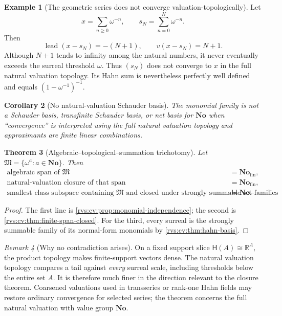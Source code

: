 \documentclass[11pt,letterpaper]{article}
\numberwithin{equation}{section}
\newtheorem{theorem}{Theorem}[section]
\newtheorem{corollary}[theorem]{Corollary}
\theoremstyle{definition}
\newtheorem{example}[theorem]{Example}
\theoremstyle{remark}
\newtheorem{remark}[theorem]{Remark}
\newcommand{\No}{\mathbf{No}}
\newcommand{\R}{\mathbb{R}}
\newcommand{\M}{\mathfrak{M}}
\newcommand{\Hahn}{\mathsf{H}}
\newcommand{\Fin}{\No_{\mathrm{fin}}}
\newcommand{\lead}{\operatorname{lead}}
\begin{document}
\begin{example}[The geometric series does not converge valuation-topologically]
Let
\[
  x=\sum_{n\ge0}\omega^{-n},
  \qquad
  s_N=\sum_{n=0}^{N}\omega^{-n}.
\]
Then
\[
  \lead(x-s_N)=-(N+1),\qquad v(x-s_N)=N+1.
\]
Although $N+1$ tends to infinity among the natural numbers, it never eventually
exceeds the surreal threshold $\omega$. Thus $(s_N)$ does not converge to $x$ in
the full natural valuation topology. Its Hahn sum is nevertheless perfectly
well defined and equals $(1-\omega^{-1})^{-1}$.
\end{example}

\begin{corollary}[No natural-valuation Schauder basis]
The monomial family is not a Schauder basis, transfinite Schauder basis, or net
basis for $\No$ when ``convergence'' is interpreted using the full natural
valuation topology and approximants are finite linear combinations.
\end{corollary}

\begin{theorem}[Algebraic--topological--summation trichotomy]\label{rvs:cv:thm:trichotomy}
Let $\M=\{\omega^a:a\in\No\}$. Then
\begin{align*}
  \text{algebraic span of }\M
    &=\Fin,\\
  \text{natural-valuation closure of that span}
    &=\Fin,\\
  \text{smallest class subspace containing }\M
     \text{ and closed under strongly summable set-families}
    &=\No.
\end{align*}
\end{theorem}

\begin{proof}
The first line is \cref{rvs:cv:prop:monomial-independence}; the second is
\cref{rvs:cv:thm:finite-span-closed}. For the third, every surreal is the strongly
summable family of its normal-form monomials by \cref{rvs:cv:thm:hahn-basis}.
\end{proof}

\begin{remark}[Why no contradiction arises]
On a fixed support slice $\Hahn(A)\cong\R^A$, the product topology makes finite-support
vectors dense. The natural valuation topology compares a tail against \emph{every}
surreal scale, including thresholds below the entire set $A$. It is therefore much
finer in the direction relevant to the closure theorem. Coarsened valuations used
in transseries or rank-one Hahn fields may restore ordinary convergence for selected
series; the theorem concerns the full natural valuation with value group $\No$.
\end{remark}
\end{document}

